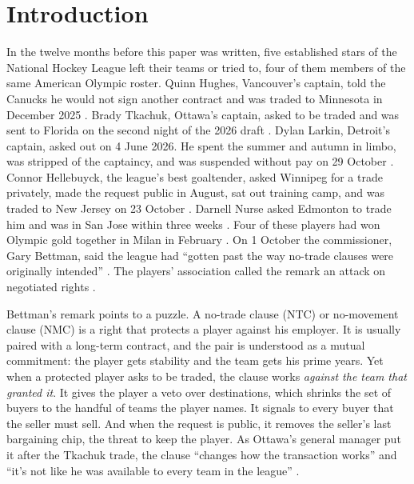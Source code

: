 \section{Introduction}\label{sec:intro}

In the twelve months before this paper was written, five established stars of the National Hockey League left their teams or tried to, four of them members of the same American Olympic roster. Quinn Hughes, Vancouver's captain, told the Canucks he would not sign another contract and was traded to Minnesota in December 2025 \citep{espn_hughes,cbs_hughes}. Brady Tkachuk, Ottawa's captain, asked to be traded and was sent to Florida on the second night of the 2026 draft \citep{cp24_tkachuk,fourthperiod_tkachuk}. Dylan Larkin, Detroit's captain, asked out on 4 June 2026. He spent the summer and autumn in limbo, was stripped of the captaincy, and was suspended without pay on 29 October \citep{wilx_larkin,nhl_larkin,cod_larkin_suspended}. Connor Hellebuyck, the league's best goaltender, asked Winnipeg for a trade privately, made the request public in August, sat out training camp, and was traded to New Jersey on 23 October \citep{nhl_hellebuyck_suspended,nhl_hellebuyck_trade}. Darnell Nurse asked Edmonton to trade him and was in San Jose within three weeks \citep{cp24_nurse,score_nurse}. Four of these players had won Olympic gold together in Milan in February \citep{nhl_olympics,dfo_trend}. On 1 October the commissioner, Gary Bettman, said the league had ``gotten past the way no-trade clauses were originally intended'' \citep{dfo_bettman}. The players' association called the remark an attack on negotiated rights \citep{tsn_hainsey}.

Bettman's remark points to a puzzle. A no-trade clause (NTC) or no-movement clause (NMC) is a right that protects a player against his employer. It is usually paired with a long-term contract, and the pair is understood as a mutual commitment: the player gets stability and the team gets his prime years. Yet when a protected player asks to be traded, the clause works \emph{against the team that granted it}. It gives the player a veto over destinations, which shrinks the set of buyers to the handful of teams the player names. It signals to every buyer that the seller must sell. And when the request is public, it removes the seller's last bargaining chip, the threat to keep the player. As Ottawa's general manager put it after the Tkachuk trade, the clause ``changes how the transaction works'' and ``it's not like he was available to every team in the league'' \citep{yahoo_staios}.

